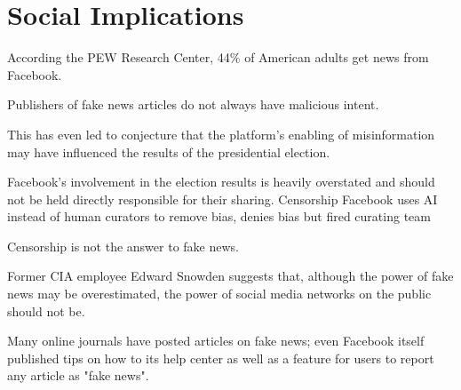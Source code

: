 
\section{Social Implications}





According the PEW Research Center, 44\% of American adults get news from Facebook. \cite{ew_social_media_news} 

Publishers of fake news articles do not always have malicious intent. \cite{cbs_fake_news}

This has even led to conjecture that the platform's enabling of misinformation may have influenced the results of the presidential election. \cite{bbc_facebook_fake_news_crisis, wp_russian_election_propaganda} 

Facebook's involvement in the election results is heavily overstated and should not be held directly responsible for their sharing. \cite{stanford_fake_news_study}
Censorship
Facebook uses AI instead of human curators to remove bias, denies bias but fired curating team \cite{tc_facebook_ai}


Censorship is not the answer to fake news. \cite{eff_cali_bill_distrastrous}

Former CIA employee Edward Snowden suggests that, although the power of fake news may be overestimated, the power of social media networks on the public should not be. \cite{tc_snowden_fb}

Many online journals have posted articles on fake news; \cite{tc_what_is_fake_news,telegraph_fake_news,npr_fake_news} even Facebook itself published tips on how to its help center \cite{fb_spot_fake_news} as well as a feature for users to report any article as "fake news". \cite{tc_fb_down_ranks_fake_news}